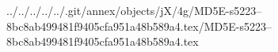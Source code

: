 ../../../../../.git/annex/objects/jX/4g/MD5E-s5223--8bc8ab499481f9405cfa951a48b589a4.tex/MD5E-s5223--8bc8ab499481f9405cfa951a48b589a4.tex